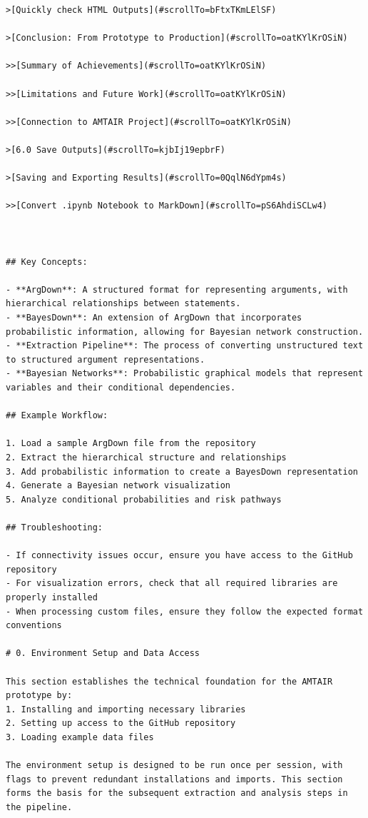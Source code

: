 \documentclass[
  11pt,
  letterpaper,
]{book}
\begin{document}
\begin{verbatim}
>[Quickly check HTML Outputs](#scrollTo=bFtxTKmLElSF)

>[Conclusion: From Prototype to Production](#scrollTo=oatKYlKrOSiN)

>>[Summary of Achievements](#scrollTo=oatKYlKrOSiN)

>>[Limitations and Future Work](#scrollTo=oatKYlKrOSiN)

>>[Connection to AMTAIR Project](#scrollTo=oatKYlKrOSiN)

>[6.0 Save Outputs](#scrollTo=kjbIj19epbrF)

>[Saving and Exporting Results](#scrollTo=0QqlN6dYpm4s)

>>[Convert .ipynb Notebook to MarkDown](#scrollTo=pS6AhdiSCLw4)



## Key Concepts:

- **ArgDown**: A structured format for representing arguments, with hierarchical relationships between statements.
- **BayesDown**: An extension of ArgDown that incorporates probabilistic information, allowing for Bayesian network construction.
- **Extraction Pipeline**: The process of converting unstructured text to structured argument representations.
- **Bayesian Networks**: Probabilistic graphical models that represent variables and their conditional dependencies.

## Example Workflow:

1. Load a sample ArgDown file from the repository
2. Extract the hierarchical structure and relationships
3. Add probabilistic information to create a BayesDown representation
4. Generate a Bayesian network visualization
5. Analyze conditional probabilities and risk pathways

## Troubleshooting:

- If connectivity issues occur, ensure you have access to the GitHub repository
- For visualization errors, check that all required libraries are properly installed
- When processing custom files, ensure they follow the expected format conventions

# 0. Environment Setup and Data Access

This section establishes the technical foundation for the AMTAIR prototype by:
1. Installing and importing necessary libraries
2. Setting up access to the GitHub repository
3. Loading example data files

The environment setup is designed to be run once per session, with flags to prevent redundant installations and imports. This section forms the basis for the subsequent extraction and analysis steps in the pipeline.


\end{verbatim}
\end{document}
